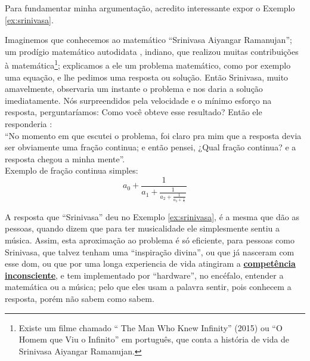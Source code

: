 Para fundamentar minha argumentação, acredito interessante expor o Exemplo \ref{ex:srinivasa}. 
\begin{example}
\label{ex:srinivasa}
Imaginemos que conhecemos ao matemático ``Srinivasa Aiyangar Ramanujan'';
um prodígio matemático autodidata \cite[pp. 1]{kanigel2016man}, indiano, que 
realizou muitas contribuições à matemática\footnote{Existe 
um filme chamado `` The Man Who Knew Infinity'' (2015) ou 
``O Homem que Viu o Infinito'' em português, que conta a história de vida de Srinivasa Aiyangar Ramanujan.};
explicamos a ele um problema  matemático, 
como por exemplo uma equação,
e  lhe pedimos uma resposta ou solução. 
Então Srinivasa, muito amavelmente, 
observaria um instante o problema e nos daria a solução imediatamente.
Nós surpreendidos pela velocidade e o mínimo esforço na resposta,
perguntaríamos: Como você obteve esse resultado? Então ele responderia \cite[pp. 235]{kanigel2016man}:\\

``No momento em que escutei o problema, 
foi claro pra mim que a resposta devia ser obviamente uma fração continua; 
e então pensei, ¿Qual fração continua? e a resposta chegou a minha mente''.\\

Exemplo de fração continua simples:
\begin{equation}
a_{0}+{\frac {1}{a_{1}+{\frac {1}{a_{2}+{\frac {1}{a_{3}+{\frac {1}{\ddots }}}}}}}}
\end{equation}
\end{example}

A resposta que ``Srinivasa'' deu no Exemplo  \ref{ex:srinivasa}, 
é a mesma  que dão as pessoas, quando  dizem que para ter musicalidade ele simplesmente sentiu a música. 
Assim, esta aproximação ao problema é só eficiente, para pessoas como Srinivasa, 
que talvez tenham uma ``inspiração divina'', 
ou que já nasceram com esse dom, ou que por uma longa experiencia de vida atingiram 
a \hyperref[ref:CompetenciaInconsciente]{\textbf{competência inconsciente}}, 
e tem implementado por ``hardware'', no encéfalo, entender a matemática ou a música; 
pelo que eles usam a palavra sentir, 
pois conhecem a resposta, porém não sabem como sabem. 

